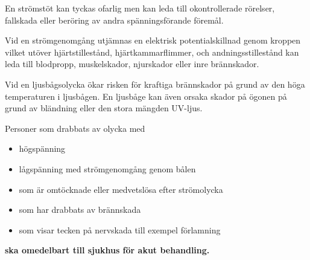 En strömstöt kan tyckas ofarlig men kan leda till okontrollerade rörelser,
fallskada eller beröring av andra spänningsförande föremål.

Vid en strömgenomgång utjämnas en elektrisk potentialskillnad genom kroppen
vilket utöver hjärtstillestånd, hjärtkammarflimmer, och andningsstillestånd
kan leda till blodpropp, muskelskador, njurskador eller inre brännskador.

Vid en ljusbågsolycka ökar risken för kraftiga brännskador på grund av den
höga temperaturen i ljusbågen.
En ljusbåge kan även orsaka skador på ögonen på grund av bländning eller den
stora mängden UV-ljus.


\bigskip
\noindent
\begin{minipage}{0.19\columnwidth}
\Huge{\selectfont{}\relax}
\end{minipage}
\begin{minipage}{0.7\columnwidth}
Personer som drabbats av olycka med
\begin{itemize}
\item högspänning
\item lågspänning med strömgenomgång genom bålen
\item som är omtöcknade eller medvetslösa efter strömolycka
\item som har drabbats av brännskada
\item som visar tecken på nervskada till exempel förlamning
\end{itemize}
\textbf{ska omedelbart till sjukhus för akut behandling.}
\end{minipage}

